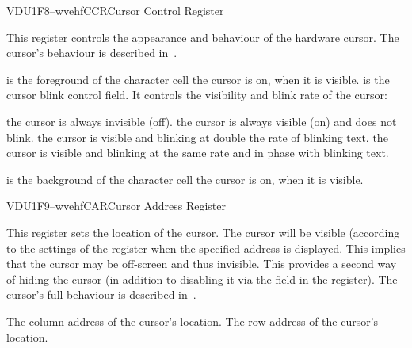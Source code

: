 \begin{ioport}{VDU}{1F8}{--wvehf}{CCR}{Cursor Control Register}

  This register controls the appearance and behaviour of the hardware
  cursor. The cursor's behaviour is described in~.

  \begin{cbitfield}[8]
  \end{cbitfield}

  \begin{description}
     is the foreground  of the character
    cell the cursor is on, when it is visible.
     is the cursor blink control field. It controls the
    visibility and blink rate of the cursor:
    
    \begin{description}
       the cursor is always invisible (off).
       the cursor is always visible (on) and does not blink.
       the cursor is visible and blinking at double the rate of
      blinking text.
       the cursor is visible and blinking at the same rate and
      in phase with blinking text.
    \end{description}
    
     is the background  of the character
    cell the cursor is on, when it is visible.
  \end{description}

\end{ioport}

\begin{ioport}{VDU}{1F9}{--wvehf}{CAR}{Cursor Address Register}

  This register sets the location of the cursor. The cursor will be visible
  (according to the settings of the  register when the specified
  address is displayed. This implies that the cursor may be off-screen and thus
  invisible. This provides a second way of hiding the cursor (in addition to
  disabling it via the  field in the  register). The
  cursor's full behaviour is described in~.

  \begin{cbitfield}[8]
     The column address of the cursor's location.
     The row address of the cursor's location.
  \end{cbitfield}

\end{ioport}


